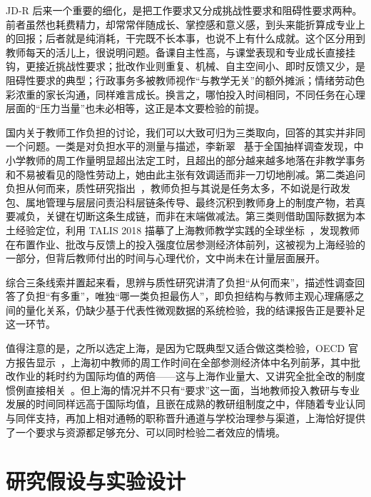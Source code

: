 \documentclass[zihao = -4, linespread = 1.5]{article}
\begin{document}
JD-R 后来一个重要的细化，是把工作要求又分成挑战性要求和阻碍性要求两种。前者虽然也耗费精力，却常常伴随成长、掌控感和意义感，到头来能折算成专业上的回报；后者就是纯消耗，干完既不长本事，也说不上有什么成就。这个区分用到教师每天的活儿上，很说明问题。备课自主性高，与课堂表现和专业成长直接挂钩，更接近挑战性要求；批改作业则重复、机械、自主空间小、即时反馈又少，是阻碍性要求的典型；行政事务多被教师视作“与教学无关”的额外摊派；情绪劳动色彩浓重的家长沟通，同样难言成长。换言之，哪怕投入时间相同，不同任务在心理层面的“压力当量”也未必相等，这正是本文要检验的前提。

国内关于教师工作负担的讨论，我们可以大致可归为三类取向，回答的其实并非同一个问题。一类是对负担水平的测量与描述，李新翠~\citep{LiXinCui} 基于全国抽样调查发现，中小学教师的周工作量明显超出法定工时，且超出的部分越来越多地落在非教学事务和不易被看见的隐性劳动上，她由此主张有效调适而非一刀切地削减。第二类追问负担从何而来，质性研究指出~\citep{SongWu}，教师负担与其说是任务太多，不如说是行政发包、属地管理与层层问责沿科层链条传导、最终沉积到教师身上的制度产物，若真要减负，关键在切断这条生成链，而非在末端做减法。第三类则借助国际数据为本土经验定位，利用 TALIS 2018 描摹了上海教师教学实践的全球坐标~\citep{WangZhang}，发现教师在布置作业、批改与反馈上的投入强度位居参测经济体前列，这被视为上海经验的一部分，但背后教师付出的时间与心理代价，文中尚未在计量层面展开。

综合三条线索并置起来看，思辨与质性研究讲清了负担“从何而来”，描述性调查回答了负担“有多重”，唯独“哪一类负担最伤人”，即负担结构与教师主观心理痛感之间的量化关系，仍缺少基于代表性微观数据的系统检验，我的结课报告正是要补足这一环节。

值得注意的是，之所以选定上海，是因为它既典型又适合做这类检验，OECD 官方报告显示~\citep{OECD}，上海初中教师的周工作时间在全部参测经济体中名列前茅，其中批改作业的耗时约为国际均值的两倍——这与上海作业量大、又讲究全批全改的制度惯例直接相关~\citep{WangZhang}。但上海的情况并不只有“要求”这一面，当地教师投入教研与专业发展的时间同样远高于国际均值，且嵌在成熟的教研组制度之中，伴随着专业认同与同伴支持，再加上相对通畅的职称晋升通道与学校治理参与渠道，上海恰好提供了一个要求与资源都足够充分、可以同时检验二者效应的情境。



\section{研究假设与实验设计}
\end{document}
